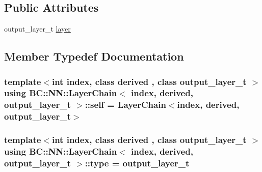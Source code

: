 \subsection*{Public Attributes}
\begin{DoxyCompactItemize}
\item 
output\+\_\+layer\+\_\+t \hyperlink{structBC_1_1NN_1_1LayerChain_3_01index_00_01derived_00_01output__layer__t_01_4_a7369e01b1ccca85830babb7e8973c893}{layer}
\end{DoxyCompactItemize}


\subsection{Member Typedef Documentation}
\subsubsection[{\texorpdfstring{self}{self}}]{\setlength{\rightskip}{0pt plus 5cm}template$<$int index, class derived , class output\+\_\+layer\+\_\+t $>$ using {\bf B\+C\+::\+N\+N\+::\+Layer\+Chain}$<$ index, derived, output\+\_\+layer\+\_\+t $>$\+::{\bf self} =  {\bf Layer\+Chain}$<$index, derived, output\+\_\+layer\+\_\+t$>$}\hypertarget{structBC_1_1NN_1_1LayerChain_3_01index_00_01derived_00_01output__layer__t_01_4_a88d5f27bbae831089991526e51e59c53}{}\label{structBC_1_1NN_1_1LayerChain_3_01index_00_01derived_00_01output__layer__t_01_4_a88d5f27bbae831089991526e51e59c53}
\subsubsection[{\texorpdfstring{type}{type}}]{\setlength{\rightskip}{0pt plus 5cm}template$<$int index, class derived , class output\+\_\+layer\+\_\+t $>$ using {\bf B\+C\+::\+N\+N\+::\+Layer\+Chain}$<$ index, derived, output\+\_\+layer\+\_\+t $>$\+::{\bf type} =  output\+\_\+layer\+\_\+t}\hypertarget{structBC_1_1NN_1_1LayerChain_3_01index_00_01derived_00_01output__layer__t_01_4_a44772210953e4d1df0dad63043048c76}{}\label{structBC_1_1NN_1_1LayerChain_3_01index_00_01derived_00_01output__layer__t_01_4_a44772210953e4d1df0dad63043048c76}


